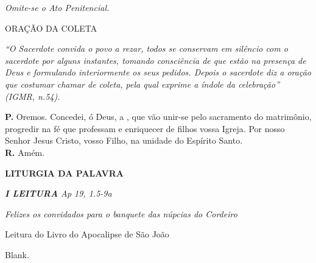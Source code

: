 \documentclass[a5paper,9pt]{memoir}
\begin{document}
{\itshape \color{mygray}Omite-se o Ato Penitencial.}
{
\begin{center}
ORAÇÃO DA COLETA
\end{center}

{\itshape \color{mygray}``O Sacerdote convida o povo a rezar, todos se conservam em silêncio com o sacerdote por alguns instantes, tomando consciência de que estão na presença de Deus e formulando interiormente os seus pedidos. Depois o sacerdote diz a oração que costumar chamar de coleta, pela qual exprime a índole da celebração'' (IGMR, n.54).}

\textbf{P.} Oremos. Concedei, \'o Deus, a \BG, que v\~ao unir-se pelo sacramento do matrim\^onio, progredir na f\'e que professam e enriquecer de filhos vossa Igreja. Por nosso Senhor Jesus Cristo, vosso Filho, na unidade do Esp\'irito Santo.\\
\textbf{R.} Amém.


\begin{center}
\bfseries
LITURGIA DA PALAVRA
\end{center}

{\itshape \color{mygray}\textbf{I LEITURA} \hfill Ap 19, 1.5-9a}
\vspace{-0.3cm}
\begin{center}
\itshape \color{mygray} \small
\guillemotleft Felizes os convidados para o banquete das núpcias do Cordeiro\guillemotright
\end{center}
\vspace{-0.3cm}

Leitura do Livro do Apocalipse de S\~ao Jo\~ao

\begin{paracol}{2}
	{\color{white}Blank.}
	
	\switchcolumn
	

\end{paracol}}
\end{document}
